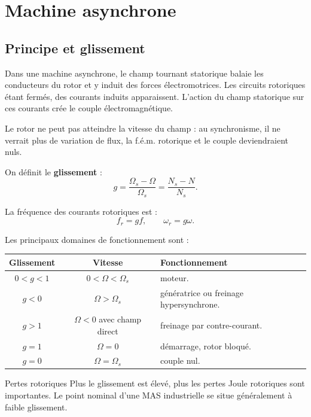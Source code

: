
\section{Machine asynchrone}
\label{sec:masms-4}

\subsection{Principe et glissement}

Dans une machine asynchrone, le champ tournant statorique balaie les conducteurs du rotor et y induit des forces électromotrices. Les circuits rotoriques étant fermés, des courants induits apparaissent. L'action du champ statorique sur ces courants crée le couple électromagnétique.

Le rotor ne peut pas atteindre la vitesse du champ : au synchronisme, il ne verrait plus de variation de flux, la f.é.m. rotorique et le couple deviendraient nuls.

On définit le \textbf{glissement} :
\[
\boxed{g=\frac{\Omega_s-\Omega}{\Omega_s}=\frac{N_s-N}{N_s}.}
\]

La fréquence des courants rotoriques est :
\[
\boxed{f_r=g f,}
\qquad
\boxed{\omega_r=g\omega.}
\]

Les principaux domaines de fonctionnement sont :
\begin{center}
\small
\begin{tabularx}{\linewidth}{>{\bfseries}c c X}
\toprule
Glissement & Vitesse & Fonctionnement \\
\midrule
$0<g<1$ & $0<\Omega<\Omega_s$ & moteur.\\
$g<0$ & $\Omega>\Omega_s$ & génératrice ou freinage hypersynchrone.\\
$g>1$ & $\Omega<0$ avec champ direct & freinage par contre-courant.\\
$g=1$ & $\Omega=0$ & démarrage, rotor bloqué.\\
$g=0$ & $\Omega=\Omega_s$ & couple nul.\\
\bottomrule
\end{tabularx}
\end{center}

\begin{TLMachineWarning}{Pertes rotoriques}
Plus le glissement est élevé, plus les pertes Joule rotoriques sont importantes. Le point nominal d'une MAS industrielle se situe généralement à faible glissement.
\end{TLMachineWarning}

